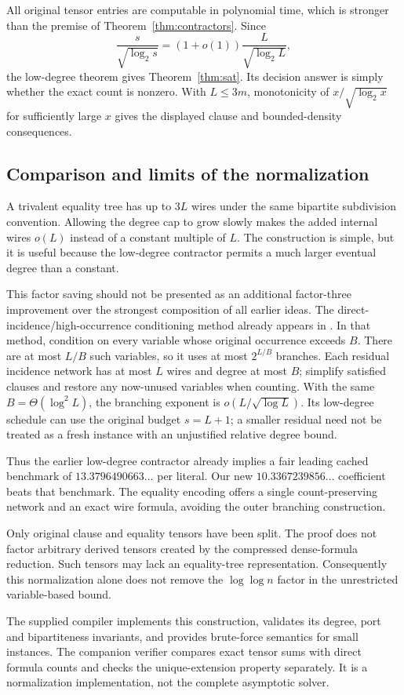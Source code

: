 All original tensor entries are computable in polynomial time, which is
stronger than the premise of Theorem~\ref{thm:contractors}. Since
\[
 \frac{s}{\sqrt{\log_2s}}=(1+o(1))\frac L{\sqrt{\log_2L}},
\]
the low-degree theorem gives Theorem~\ref{thm:sat}. Its decision answer
is simply whether the exact count is nonzero. With $L\le3m$, monotonicity
of $x/\sqrt{\log_2x}$ for sufficiently large $x$ gives the displayed
clause and bounded-density consequences.

\subsection{Comparison and limits of the normalization}

A trivalent equality tree has up to $3L$ wires under the same bipartite
subdivision convention. Allowing the degree cap to grow slowly makes
the added internal wires $o(L)$ instead of a constant multiple of $L$.
The construction is simple, but it is useful because the low-degree
contractor permits a much larger eventual degree than a constant.

This factor saving should not be presented as an additional factor-three
improvement over the strongest composition of all earlier ideas.
The direct-incidence/high-occurrence conditioning method already appears
in \cite{balanced}. In that method, condition on every variable whose
original occurrence exceeds $B$. There are at most $L/B$ such variables,
so it uses at most $2^{L/B}$ branches. Each residual incidence network
has at most $L$ wires and degree at most $B$; simplify satisfied clauses
and restore any now-unused variables when counting. With the same
$B=\Theta(\log^2L)$, the branching exponent is
$o(L/\sqrt{\log L})$. Its low-degree schedule can use the original
budget $s=L+1$; a smaller residual need not be treated as a fresh
instance with an unjustified relative degree bound.

Thus the earlier low-degree contractor already implies a fair leading
cached benchmark of $13.3796490663\ldots$ per literal. Our new
$10.3367239856\ldots$ coefficient beats that benchmark. The equality
encoding offers a single count-preserving network and an exact wire
formula, avoiding the outer branching construction.

Only original clause and equality tensors have been split. The proof
does not factor arbitrary derived tensors created by the compressed
dense-formula reduction. Such tensors may lack an equality-tree
representation. Consequently this normalization alone does not remove
the $\log\log n$ factor in the unrestricted variable-based bound.

The supplied compiler implements this construction, validates its degree,
port and bipartiteness invariants, and provides brute-force semantics for
small instances. The companion verifier compares exact tensor sums with
direct formula counts and checks the unique-extension property separately.
It is a normalization implementation, not the complete asymptotic solver.
